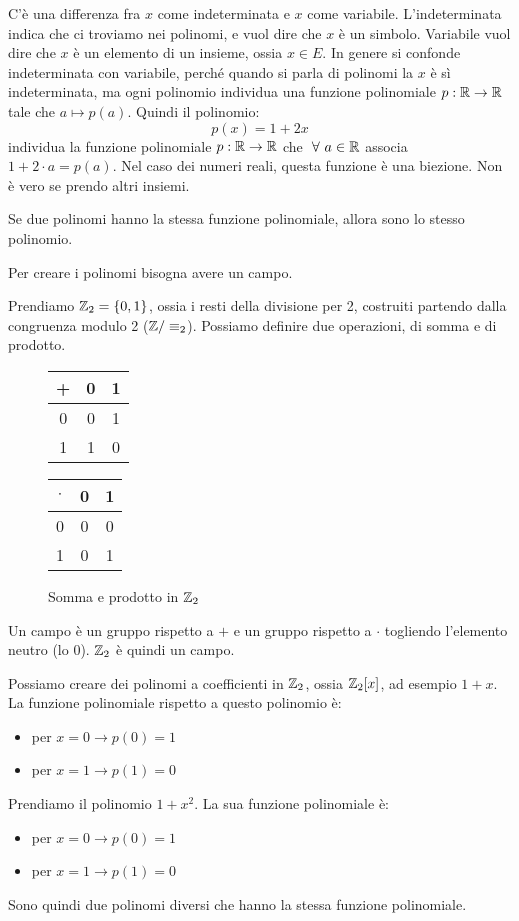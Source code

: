 C'\`e una differenza fra $x$ come indeterminata e $x$ come variabile. L'indeterminata indica che ci troviamo nei polinomi, e vuol dire che $x$ \`e un simbolo. Variabile vuol dire che $x$ \`e un elemento di un insieme, ossia $x \in E$. In genere si confonde indeterminata con variabile, perch\'e quando si parla di polinomi la $x$ \`e s\`i indeterminata, ma ogni polinomio individua una funzione polinomiale $p : \mathbb{R} \to \mathbb{R}$ tale che $ a \mapsto p(a)$. Quindi il polinomio:
\[
p(x) = 1 + 2x
\]
individua la funzione polinomiale $p : \mathbb{R} \to \mathbb{R}$ che $ \forall a \in \reals$ associa $1 + 2 \cdot a = p(a)$. Nel caso dei numeri reali, questa funzione \`e una biezione. Non \`e vero se prendo altri insiemi.

\begin{defn}
Se due polinomi hanno la stessa funzione polinomiale, allora sono lo stesso polinomio. 
\end{defn}

Per creare i polinomi bisogna avere un campo.

Prendiamo $\mathbb{Z}_2 = \{ 0, 1 \}$, ossia i resti della divisione per 2, costruiti partendo dalla congruenza modulo 2 ($\mathbb{Z} / \equiv_2$). Possiamo definire due operazioni, di somma e di prodotto.

\begin{figure}[ht]
\centering
\begin{tabular}{c|cc}
+ & 0 & 1 \\
\hline
0 & 0 & 1 \\
1 & 1 & 0
\end{tabular}
\quad
\begin{tabular}{c|cc}
$\cdot$ & 0 & 1 \\
\hline
0 & 0 & 0 \\
1 & 0 & 1
\end{tabular}
\caption{Somma e prodotto in $\mathbb{Z}_2$}
\end{figure}

Un campo \`e un gruppo rispetto a $+$ e un gruppo rispetto a $\cdot$ togliendo l'elemento neutro (lo 0). $\mathbb{Z}_2$ \`e quindi un campo.

Possiamo creare dei polinomi a coefficienti in $\mathbb{Z}_2$, ossia $\mathbb{Z}_2[x]$, ad esempio $1 + x$. La funzione polinomiale rispetto a questo polinomio \`e:
\begin{itemize}
    \item per $x = 0 \to p(0) = 1$
    \item per $x = 1 \to p(1) = 0$
\end{itemize}
Prendiamo il polinomio $1 + x^2$. La sua funzione polinomiale \`e:
\begin{itemize}
    \item per $x = 0 \to p(0) = 1$
    \item per $x = 1 \to p(1) = 0$
\end{itemize}
Sono quindi due polinomi diversi che hanno la stessa funzione polinomiale.

